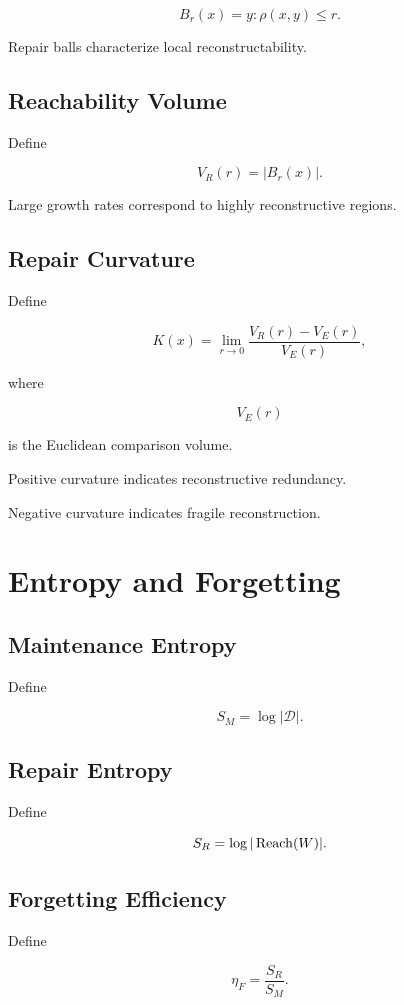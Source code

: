 \documentclass[12pt,oneside]{book}
\theoremstyle{plain} \newtheorem{theorem}{Theorem}[chapter] \newtheorem{lemma}[theorem]{Lemma} \newtheorem{proposition}[theorem]{Proposition} \newtheorem{corollary}[theorem]{Corollary}
\theoremstyle{definition} \newtheorem{definition}[theorem]{Definition} \newtheorem{axiom}[theorem]{Axiom} \newtheorem{construction}[theorem]{Construction}
\theoremstyle{remark} \newtheorem{remark}[theorem]{Remark} \newtheorem{example}[theorem]{Example}
\newcommand{\D}{\mathcal{D}} \newcommand{\R}{\mathcal{R}} \newcommand{\F}{\mathcal{F}} \newcommand{\U}{\mathcal{U}} \newcommand{\M}{\mathcal{M}} \newcommand{\G}{\Gamma}
\begin{document}
\[
B_r(x)
=
{
y :
\rho(x,y)\le r
}.
\]

Repair balls characterize local reconstructability.

\section{Reachability Volume}

Define

\[
V_R(r)
=
|B_r(x)|.
\]

Large growth rates correspond to highly reconstructive regions.

\section{Repair Curvature}

Define

\[
K(x)
=
\lim_{r\to 0}
\frac{V_R(r)-V_E(r)}
{V_E(r)},
\]

where

\[
V_E(r)
\]

is the Euclidean comparison volume.

Positive curvature indicates reconstructive redundancy.

Negative curvature indicates fragile reconstruction.

\chapter{Entropy and Forgetting}

\section{Maintenance Entropy}

Define

\[
S_M
=
\log |\D|.
\]

\section{Repair Entropy}

Define

\[
S_R
=
\log
|\operatorname{Reach}(W)|.
\]

\section{Forgetting Efficiency}

Define

\[
\eta_F
=
\frac{S_R}{S_M}.
\]
\end{document}
